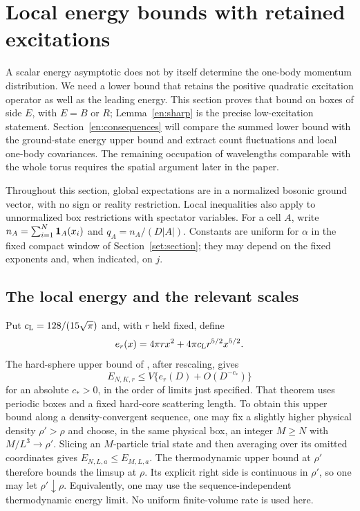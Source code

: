\section{Local energy bounds with retained excitations}\label{en:section}\label{sec:energy}

A scalar energy asymptotic does not by itself determine the one-body
momentum distribution.  We need a lower bound that retains the positive
quadratic excitation operator as well as the leading energy.  This
section proves that bound on boxes of side $E$, with $E=B$ or $R$;
Lemma~\ref{en:sharp} is the precise low-excitation statement.
Section~\ref{en:consequences} will compare the summed lower bound with
the ground-state energy upper bound and extract count fluctuations and
local one-body covariances.  The remaining occupation of wavelengths
comparable with the whole torus requires the spatial argument later in
the paper.

Throughout this section, global expectations are in a normalized bosonic
ground vector, with no sign or reality restriction.  Local inequalities
also apply to unnormalized box restrictions with spectator variables.
For a cell $A$, write $n_A=\sum_{i=1}^N\mathbf 1_A(x_i)$ and
$q_A=n_A/(D|A|)$.  Constants are uniform for $\alpha$ in the fixed compact
window of Section~\ref{set:section}; they may depend on the fixed
exponents and, when indicated, on $j$.

\subsection{The local energy and the relevant scales}

Put $c_{\rm L}=128/(15\sqrt\pi)$ and, with $r$ held fixed, define
\begin{equation}\label{en:energy-density}
 e_r(x)=4\pi r x^2+4\pi c_{\rm L}r^{5/2}x^{5/2}.
\end{equation}
The hard-sphere upper bound of \cite[Theorem~1.1]{BBCOS}, after rescaling,
gives
\begin{equation}\label{en:upper}
 E_{N,K,r}\le V\{e_r(D)+O(D^{-c_*})\}
\end{equation}
for an absolute $c_*>0$, in the order of limits just specified.  That
theorem uses periodic boxes and a fixed hard-core scattering length.
To obtain this upper bound along a density-convergent sequence, one may
fix a slightly higher physical density $\rho'>\rho$ and choose, in the
same physical box, an integer $M\ge N$ with $M/L^3\to\rho'$.
Slicing an $M$-particle trial state and then averaging over its omitted
coordinates gives $E_{N,L,a}\le E_{M,L,a}$.  The thermodynamic upper
bound at $\rho'$ therefore bounds the limsup at $\rho$.  Its explicit
right side is continuous in $\rho'$, so one may let $\rho'\downarrow\rho$.
Equivalently, one may use the sequence-independent thermodynamic energy
limit.  No uniform finite-volume rate is used here.

